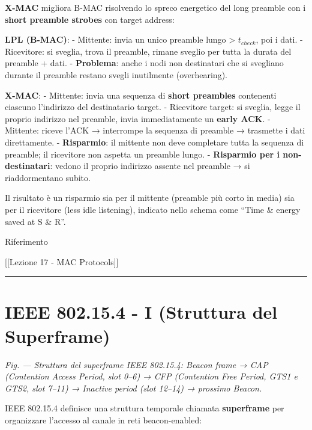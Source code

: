 \documentclass[
  italian,
  openany]{book}
\begin{document}
\textbf{X-MAC} migliora B-MAC risolvendo lo spreco energetico del long
preamble con i \textbf{short preamble strobes} con target address:

\textbf{LPL (B-MAC)}: - Mittente: invia un unico preamble lungo
\textgreater{} \(t_{check}\), poi i dati. - Ricevitore: si sveglia,
trova il preamble, rimane sveglio per tutta la durata del preamble +
dati. - \textbf{Problema}: anche i nodi non destinatari che si svegliano
durante il preamble restano svegli inutilmente (overhearing).

\textbf{X-MAC}: - Mittente: invia una sequenza di \textbf{short
preambles} contenenti ciascuno l'indirizzo del destinatario target. -
Ricevitore target: si sveglia, legge il proprio indirizzo nel preamble,
invia immediatamente un \textbf{early ACK}. - Mittente: riceve l'ACK →
interrompe la sequenza di preamble → trasmette i dati direttamente. -
\textbf{Risparmio}: il mittente non deve completare tutta la sequenza di
preamble; il ricevitore non aspetta un preamble lungo. -
\textbf{Risparmio per i non-destinatari}: vedono il proprio indirizzo
assente nel preamble → si riaddormentano subito.

Il risultato è un risparmio sia per il mittente (preamble più corto in
media) sia per il ricevitore (less idle listening), indicato nello
schema come ``Time \& energy saved at S \& R''.

\begin{calloutnote}{Riferimento}

{[}{[}Lezione 17 - MAC Protocols{]}{]}

\end{calloutnote}

\begin{center}\rule{0.5\linewidth}{0.5pt}\end{center}

\section{IEEE 802.15.4 - I (Struttura del
Superframe)}\label{ieee-802.15.4---i-struttura-del-superframe}

\emph{Fig. --- Struttura del superframe IEEE 802.15.4: Beacon frame →
CAP (Contention Access Period, slot 0--6) → CFP (Contention Free Period,
GTS1 e GTS2, slot 7--11) → Inactive period (slot 12--14) → prossimo
Beacon.}

IEEE 802.15.4 definisce una struttura temporale chiamata
\textbf{superframe} per organizzare l'accesso al canale in reti
beacon-enabled:
\end{document}

